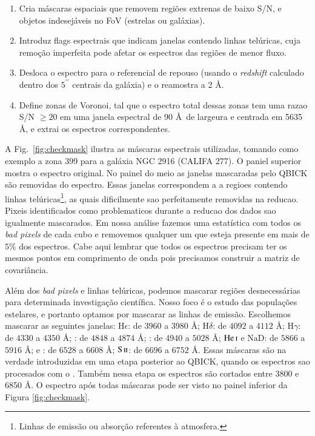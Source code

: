 \begin{enumerate}

\item Cria máscaras espaciais que removem regiões extrenas de baixo S/N, e objetos indesejáveis no FoV (estrelas ou
galáxias).

\item Introduz flags espectrais que indicam janelas contendo linhas telúricas, cuja remoção imperfeita pode afetar os
espectros das regiões de menor fluxo.

\item Desloca o espectro para o referencial de repouso (usando o {\em redshift} calculado dentro dos $5^{\prime\prime}$
centrais da galáxia) e o reamostra a 2 \AA.

\item Define zonas de Voronoi, tal que o espectro total dessas zonas tem uma razao S/N $\ge 20$ em uma janela espectral
de 90 \AA\ de largeura e centrada em 5635 \AA, e extrai os espectros correspondentes.

\end{enumerate}

A Fig.\ \ref{fig:checkmask} ilustra as máscaras espectrais utilizadas, tomando como exemplo a zona 399 para a galáxia
NGC 2916 (CALIFA 277). O paniel superior mostra o espectro original. No painel do meio as janelas mascaradas pelo QBICK
são removidas do espectro. Essas janelas correspondem a a regioes contendo linhas telúricas\footnote{Linhas de emissão
ou absorção referentes à atmosfera.}, as quais dificilmente sao perfeitamente removidas na reducao. Pixeis identificados
como problematicos durante a reducao dos dados sao igualmente mascarados. Em nossa análise fazemos uma estatística com
todos os {\em bad pixels} de cada cubo e removemos qualquer um que esteja presente em mais de $5\%$ dos espectros. Cabe
aqui lembrar que todos os espectros precisam ter os mesmos pontos em comprimento de onda pois precisamos construir a
matriz de covariância.
                                                                                                                                                                                                                                                                               
Além dos {\em bad pixels} e linhas telúricas, podemos mascarar regiões desnecessárias para determinada investigação
científica. Nosso foco é o estudo das populações estelares, e portanto optamos por mascarar as linhas de emissão.
Escolhemos mascarar as seguintes janelas: $\mathrm{H}\epsilon$: de $3960$ a $3980$ \AA; $\mathrm{H}\delta$: de $4092$ a
$4112$ \AA; $\mathrm{H}\gamma$: de $4330$ a $4350$ \AA; \Hbeta: de $4848$ a $4874$ \AA; \oIII: de $4940$ a $5028$ \AA;
$\mathrm{He\,\textsc{i}}$ e $\mathrm{NaD}$: de $5866$ a $5916$ \AA; \Halpha e \nII: de $6528$ a $6608$ \AA;
$\mathrm{S\,\textsc{ii}}$: de $6696$ a $6752$ \AA. Essas máscaras são na verdade introduzidas em uma etapa posterior ao
QBICK, quando os espectros sao procesados com o \starlight. Também nessa etapa os espectros são cortados entre 3800 e
6850 \AA. O espectro após todas máscaras pode ser visto no painel inferior da Figura \ref{fig:checkmask}.



